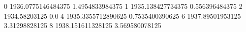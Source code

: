 0 1936.0775146484375 1.4954833984375
1 1935.138427734375 0.556396484375
2 1934.58203125 0.0
4 1935.3355712890625 0.7535400390625
6 1937.89501953125 3.31298828125
8 1938.151611328125 3.569580078125
